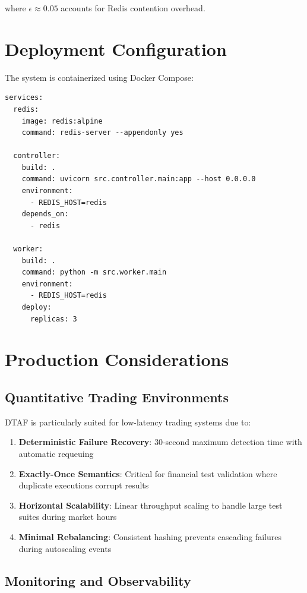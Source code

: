 \documentclass[11pt,a4paper]{article}
\begin{document}
where $\epsilon \approx 0.05$ accounts for Redis contention overhead.

\section{Deployment Configuration}

The system is containerized using Docker Compose:

\begin{lstlisting}[style=yamlstyle, caption=Docker Compose Configuration (Excerpt)]
services:
  redis:
    image: redis:alpine
    command: redis-server --appendonly yes
    
  controller:
    build: .
    command: uvicorn src.controller.main:app --host 0.0.0.0
    environment:
      - REDIS_HOST=redis
    depends_on:
      - redis
      
  worker:
    build: .
    command: python -m src.worker.main
    environment:
      - REDIS_HOST=redis
    deploy:
      replicas: 3
\end{lstlisting}

\section{Production Considerations}

\subsection{Quantitative Trading Environments}

DTAF is particularly suited for low-latency trading systems due to:

\begin{enumerate}
    \item \textbf{Deterministic Failure Recovery}: 30-second maximum detection time with automatic requeuing
    \item \textbf{Exactly-Once Semantics}: Critical for financial test validation where duplicate executions corrupt results
    \item \textbf{Horizontal Scalability}: Linear throughput scaling to handle large test suites during market hours
    \item \textbf{Minimal Rebalancing}: Consistent hashing prevents cascading failures during autoscaling events
\end{enumerate}

\subsection{Monitoring and Observability}
\end{document}
